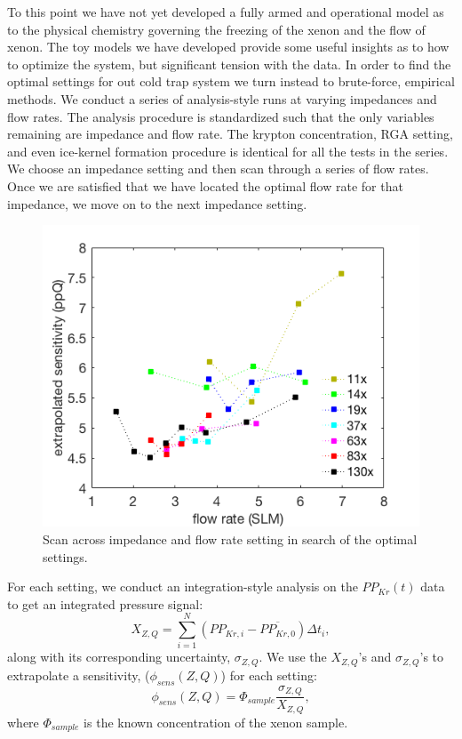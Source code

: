 \documentclass[12pt]{article}
\begin{document}
To this point we have not yet developed a fully armed and operational model as to the physical chemistry governing the freezing of the xenon and the flow of xenon. The toy models we have developed provide some useful insights as to how to optimize the system, but significant tension with the data. In order to find the optimal settings for out cold trap system we turn instead to brute-force, empirical methods. We conduct a series of analysis-style runs at varying impedances and flow rates.  The analysis procedure is standardized such that the only variables remaining are impedance and flow rate. The krypton concentration, RGA setting, and even ice-kernel formation procedure is identical for all the tests in the series. We choose an impedance setting and then scan through a series of flow rates. Once we are satisfied that we have located the optimal flow rate for that impedance, we move on to the next  impedance setting.
\begin{figure}[h]
  \includegraphics[width=\linewidth]{Figures/SLAC_flowimpedance_response_plot.png}
  \caption{Scan across impedance and flow rate setting in search of the optimal settings.}
  \label{fig:sensscan}
\end{figure}

For each setting, we conduct an integration-style analysis on the $PP_{Kr}(t)$ data to get an integrated pressure signal:
\begin{equation}
 X_{Z,Q}=\sum_{i=1}^{N}(PP_{Kr,i}-\overline{PP_{Kr,0}})\Delta t_i,
 \end{equation}
along with its corresponding uncertainty, $\sigma_{Z,Q}$. We use the $X_{Z,Q}$'s and $\sigma_{Z,Q}$'s to extrapolate a sensitivity, ($\phi_{sens}(Z,Q)$) for each setting:
\begin{equation}
\phi_{sens}(Z,Q)=\Phi_{sample}\frac{\sigma_{Z,Q}}{X_{Z,Q}},
\end{equation}
where $\Phi_{sample}$ is the known concentration of the xenon sample. 
\end{document}
